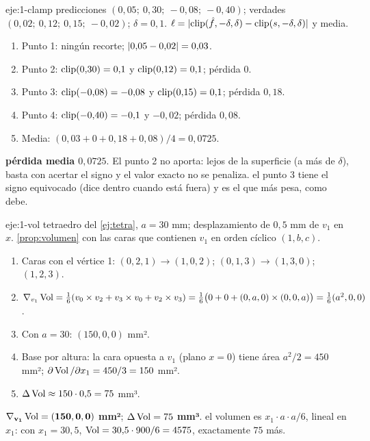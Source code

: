 \begin{solucion}{eje:1-clamp}
\datos predicciones $(0{,}05;\ 0{,}30;\ -0{,}08;\ -0{,}40)$; verdades $(0{,}02;\ 0{,}12;\ 0{,}15;\ -0{,}02)$; $\delta=0{,}1$.
\planteamiento $\ell=\lvert\operatorname{clip}(\hat f,-\delta,\delta)-\operatorname{clip}(s,-\delta,\delta)\rvert$ y media.
\pasos
\begin{enumerate}[label=\arabic*.]
  \item Punto 1: ningún recorte; $\lvert0{,}05-0{,}02\rvert=0{,}03$.
  \item Punto 2: $\operatorname{clip}(0{,}30)=0{,}1$ y $\operatorname{clip}(0{,}12)=0{,}1$; pérdida $0$.
  \item Punto 3: $\operatorname{clip}(-0{,}08)=-0{,}08$ y $\operatorname{clip}(0{,}15)=0{,}1$; pérdida $0{,}18$.
  \item Punto 4: $\operatorname{clip}(-0{,}40)=-0{,}1$ y $-0{,}02$; pérdida $0{,}08$.
  \item Media: $(0{,}03+0+0{,}18+0{,}08)/4=0{,}0725$.
\end{enumerate}
\resultado \textbf{pérdida media $0{,}0725$}. El punto 2 no aporta: lejos de la superficie (a más de $\delta$), basta con acertar el signo y el valor exacto no se penaliza.
\comprobacion el punto 3 tiene el signo equivocado (dice dentro cuando está fuera) y es el que más pesa, como debe.
\end{solucion}

\begin{solucion}{eje:1-vol}
\datos tetraedro del \cref{ej:tetra}, $a=30$ mm; desplazamiento de $0{,}5$ mm de $v_1$ en $x$.
\planteamiento \cref{prop:volumen} con las caras que contienen $v_1$ en orden cíclico $(1,b,c)$.
\pasos
\begin{enumerate}[label=\arabic*.]
  \item Caras con el vértice 1: $(0,2,1)\to(1,0,2)$; $(0,1,3)\to(1,3,0)$; $(1,2,3)$.
  \item $\nabla_{v_1}\operatorname{Vol}=\tfrac16(v_0\times v_2+v_3\times v_0+v_2\times v_3)=\tfrac16\bigl(0+0+(0,a,0)\times(0,0,a)\bigr)=\tfrac16(a^2,0,0)$.
  \item Con $a=30$: $(150,0,0)$ mm².
  \item Base por altura: la cara opuesta a $v_1$ (plano $x=0$) tiene área $a^2/2=450$ mm²; $\partial\operatorname{Vol}/\partial x_1=450/3=150$ mm².
  \item $\Delta\operatorname{Vol}\approx 150\cdot 0{,}5=75$ mm³.
\end{enumerate}
\resultado $\mathbf{\nabla_{v_1}\operatorname{Vol}=(150,0,0)}$ \textbf{mm²}; \textbf{$\Delta\operatorname{Vol}=75$ mm³}.
\comprobacion el volumen es $x_1\cdot a\cdot a/6$, lineal en $x_1$: con $x_1=30{,}5$, $\operatorname{Vol}=30{,}5\cdot 900/6=4575$, exactamente $75$ más.
\end{solucion}

